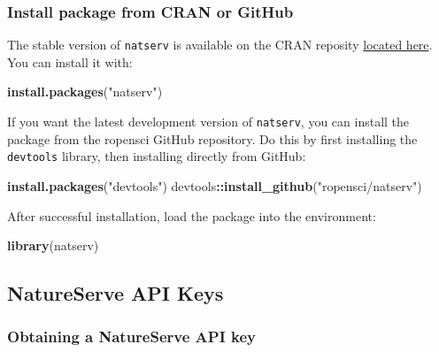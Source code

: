\documentclass[]{article}
\newenvironment{Shaded}{\begin{snugshade}}{\end{snugshade}}
\newcommand{\KeywordTok}[1]{\textcolor[rgb]{0.13,0.29,0.53}{\textbf{#1}}}
\newcommand{\NormalTok}[1]{#1}
\newcommand{\OperatorTok}[1]{\textcolor[rgb]{0.81,0.36,0.00}{\textbf{#1}}}
\newcommand{\StringTok}[1]{\textcolor[rgb]{0.31,0.60,0.02}{#1}}
\begin{document}
\hypertarget{install-package-from-cran-or-github}{%
\subsubsection{Install package from CRAN or
GitHub}\label{install-package-from-cran-or-github}}

The stable version of \texttt{natserv} is available on the CRAN reposity
\href{https://cran.r-project.org/web/packages/natserv/}{located here}.
You can install it with:

\begin{Shaded}
\begin{Highlighting}[]
\KeywordTok{install.packages}\NormalTok{(}\StringTok{"natserv"}\NormalTok{)}
\end{Highlighting}
\end{Shaded}

If you want the latest development version of \texttt{natserv}, you can
install the package from the ropensci GitHub repository. Do this by
first installing the \texttt{devtools} library, then installing directly
from GitHub:

\begin{Shaded}
\begin{Highlighting}[]
\KeywordTok{install.packages}\NormalTok{(}\StringTok{"devtools"}\NormalTok{)}
\NormalTok{devtools}\OperatorTok{::}\KeywordTok{install_github}\NormalTok{(}\StringTok{"ropensci/natserv"}\NormalTok{)}
\end{Highlighting}
\end{Shaded}

After successful installation, load the package into the environment:

\begin{Shaded}
\begin{Highlighting}[]
\KeywordTok{library}\NormalTok{(natserv)}
\end{Highlighting}
\end{Shaded}

\hypertarget{natureserve-api-keys}{%
\subsection{NatureServe API Keys}\label{natureserve-api-keys}}

\hypertarget{obtaining-a-natureserve-api-key}{%
\subsubsection{Obtaining a NatureServe API
key}\label{obtaining-a-natureserve-api-key}}
\end{document}
